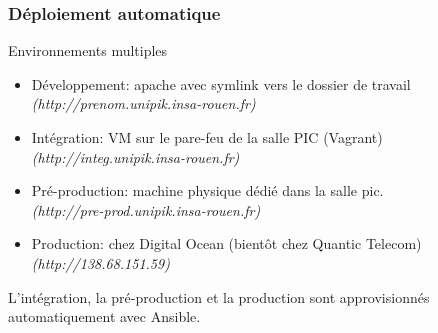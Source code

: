 \begin{frame}
\frametitle{Déploiement automatique}
\begin{block}{Environnements multiples}
	\begin{itemize}
		\item Développement: apache avec symlink vers le dossier de travail \\
		\emph{\tiny(http://prenom.unipik.insa-rouen.fr)}
		\item Intégration: VM sur le pare-feu de la salle PIC (Vagrant) \\
		\emph{\tiny(http://integ.unipik.insa-rouen.fr)}
		\item Pré-production: machine physique dédié dans la salle pic. \\
		\emph{\tiny(http://pre-prod.unipik.insa-rouen.fr)}
		\item Production: chez Digital Ocean (bientôt chez Quantic Telecom) \\
		\emph{\tiny(http://138.68.151.59)}
	\end{itemize}
\end{block}

L'intégration, la pré-production et la production sont approvisionnés automatiquement avec Ansible.

\end{frame}

